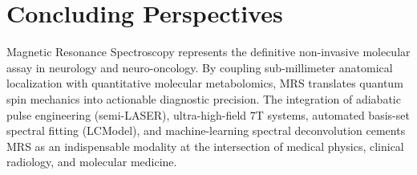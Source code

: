 \documentclass[11pt,a4paper]{article}
\begin{document}
\section{Concluding Perspectives}
Magnetic Resonance Spectroscopy represents the definitive non-invasive molecular assay in neurology and neuro-oncology. By coupling sub-millimeter anatomical localization with quantitative molecular metabolomics, MRS translates quantum spin mechanics into actionable diagnostic precision. The integration of adiabatic pulse engineering (semi-LASER), ultra-high-field 7T systems, automated basis-set spectral fitting (LCModel), and machine-learning spectral deconvolution cements MRS as an indispensable modality at the intersection of medical physics, clinical radiology, and molecular medicine.
\end{document}
